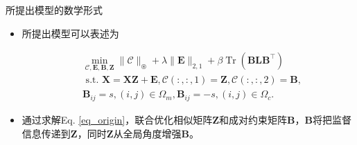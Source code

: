 \documentclass{beamer}
\begin{document}
        

\begin{frame}{所提出模型的数学形式}

    \begin{itemize}
            \item 所提出模型可以表述为
        
	\begin{equation}
		\begin{aligned}
			&\min _{\mathcal{C}, \mathbf{E}, \mathbf{B}, \mathbf{Z} }\|\mathcal{C}\|_{\circledast}+\lambda\|\mathbf{E}\|_{2,1}+\beta\operatorname{Tr}(\mathbf{B L B}^{\top}) \\
			&\text { s.t. } \mathbf{X}=\mathbf{X Z}+\mathbf{E}, \mathcal{C}(:,:,1)=\mathbf{Z}, \mathcal{C}(:,:,2)=\mathbf{B},  \\
			&\mathbf{B}_{i j}=s,(i, j) \in \Omega_{m}, \mathbf{B}_{i j}=-s,(i, j) \in \Omega_{c}. %
		\end{aligned}
		\label{eq_origin}
	\end{equation}

            \vspace{0.2cm}
            \item 通过求解Eq. \eqref{eq_origin}，联合优化相似矩阵$\mathbf{Z}$和成对约束矩阵$\mathbf{B}$，$\mathbf{B}$将把监督信息传递到$\mathbf{Z}$，同时$\mathbf{Z}$从全局角度增强$\mathbf{B}$。
    \end{itemize}
\end{frame}


	
\end{document}
